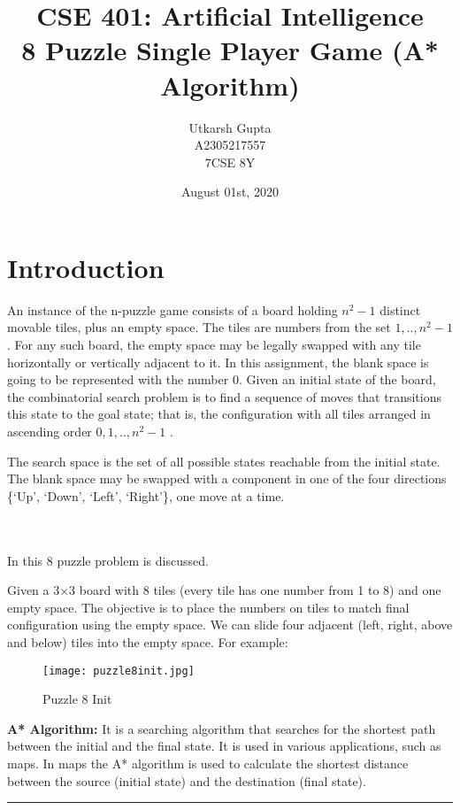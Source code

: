 \documentclass[11pt]{article}
\title{%
    CSE 401: Artificial Intelligence \\
    \large 8 Puzzle Single Player Game (A* Algorithm)}
\author{%
      Utkarsh Gupta \\
      \small A2305217557 \\
      \small 7CSE 8Y}
\date{August 01st, 2020}
\begin{document}
    
    \maketitle
    
    
    \hypertarget{introduction}{%
\section{Introduction}\label{introduction}}

An instance of the n-puzzle game consists of a board holding \(n^{2}-1\)
distinct movable tiles, plus an empty space. The tiles are numbers from
the set \(1,..,n^{2}-1\). For any such board, the empty space may be
legally swapped with any tile horizontally or vertically adjacent to it.
In this assignment, the blank space is going to be represented with the
number 0. Given an initial state of the board, the combinatorial search
problem is to find a sequence of moves that transitions this state to
the goal state; that is, the configuration with all tiles arranged in
ascending order \(0,1,..,n^{2}-1\) .

The search space is the set of all possible states reachable from the
initial state. The blank space may be swapped with a component in one of
the four directions \{`Up', `Down', `Left', `Right'\}, one move at a
time.

    ~\\
    ~\\
    In this 8 puzzle problem is discussed.

Given a 3×3 board with 8 tiles (every tile has one number from 1 to 8)
and one empty space. The objective is to place the numbers on tiles to
match final configuration using the empty space. We can slide four
adjacent (left, right, above and below) tiles into the empty space. For
example:

\begin{figure}
\centering
\texttt{[image: puzzle8init.jpg]}
\caption{Puzzle 8 Init}
\end{figure}

    \newpage
    \textbf{A* Algorithm:} It is a searching algorithm that searches for the
shortest path between the initial and the final state. It is used in
various applications, such as maps. In maps the A* algorithm is used to
calculate the shortest distance between the source (initial state) and
the destination (final state).

    \noindent\rule{16.5cm}{0.4pt}
    ~\\
\end{document}
